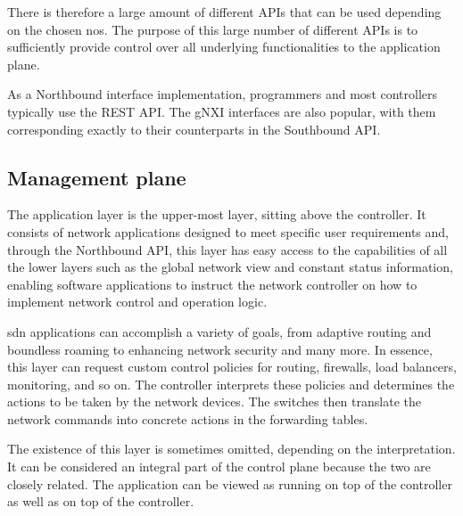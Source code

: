 There is therefore a large amount of different APIs that can be used depending on the chosen \gls{nos}. The purpose of this large number of different APIs is to sufficiently provide control over all underlying functionalities to the application plane\cite{peterson_software-defined_2021}.

As a Northbound interface implementation, programmers and most controllers typically use the REST API\cite{latif_comprehensive_2020}. The gNXI interfaces are also popular, with them corresponding exactly to their counterparts in the Southbound API\cite{peterson_software-defined_2021}. 
        

\subsection{Management plane} %
The application layer is the upper-most layer, sitting above the controller. It consists of network applications designed to meet specific user requirements and, through the Northbound API, this layer has easy access to the capabilities of all the lower layers such as the global network view and constant status information, enabling software applications to instruct the network controller on how to implement network control and operation logic\cite{xia_survey_2015}\cite{liatifis_advancing_2023}. 

\gls{sdn} applications can accomplish a variety of goals, from adaptive routing and boundless roaming to enhancing network security and many more\cite{xia_survey_2015}. In essence, this layer can request custom control policies for routing, firewalls, load balancers, monitoring, and so on. The controller interprets these policies and determines the actions to be taken by the network devices. The switches then translate the network commands into concrete actions in the forwarding tables\cite{kreutz_software-defined_2015}. 

The existence of this layer is sometimes omitted, depending on the interpretation. It can be considered an integral part of the control plane because the two are closely related. The application can be viewed as running on top of the controller as well as on top of the controller\cite{peterson_software-defined_2021}.


